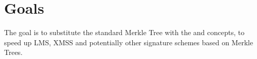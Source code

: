 

\section{Goals} 


The goal is to substitute the standard Merkle Tree with the \tftree and \extree concepts, to speed up LMS, XMSS and potentially other signature schemes based on Merkle Trees.




